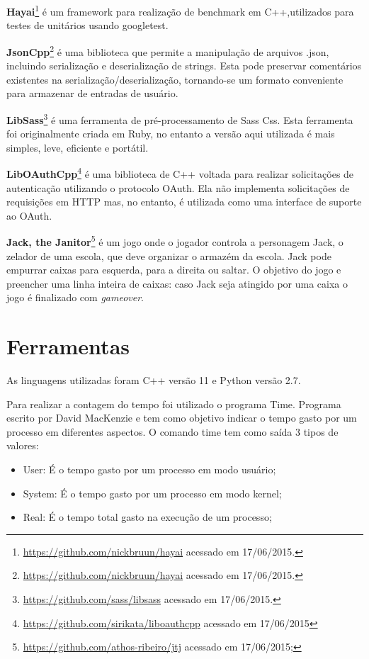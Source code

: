 \textbf{Hayai}\footnote{\url{https://github.com/nickbruun/hayai} acessado em
 17/06/2015.} é um framework para realização de benchmark em C++,utilizados
 para testes de unitários usando googletest.

\textbf{JsonCpp}\footnote{\url{https://github.com/nickbruun/hayai} acessado
 em 17/06/2015.} é uma biblioteca que permite a manipulação de arquivos .json,
 incluindo serialização e deserialização de strings. Esta pode preservar
 comentários existentes na serialização/deserialização, tornando-se um formato
 conveniente para armazenar de entradas de usuário.

\textbf{LibSass}\footnote{\url{https://github.com/sass/libsass} acessado
 em 17/06/2015.} é uma ferramenta de pré-processamento de Sass Css. Esta
 ferramenta foi originalmente criada em Ruby, no entanto a versão aqui utilizada
 é mais simples, leve, eficiente e portátil.

\textbf{LibOAuthCpp}\footnote{\url{https://github.com/sirikata/liboauthcpp}
 acessado em 17/06/2015} é uma biblioteca de C++ voltada para realizar solicitações
 de autenticação utilizando o protocolo OAuth. Ela não implementa solicitações de
 requisições em HTTP mas, no entanto, é utilizada como uma interface de suporte ao
 OAuth.

\textbf{Jack, the Janitor}\footnote{\url{https://github.com/athos-ribeiro/jtj}
 acessado em 17/06/2015;} é um jogo onde o jogador controla  a personagem Jack,
 o zelador de uma escola, que deve organizar o armazém da escola. Jack pode empurrar
 caixas para esquerda, para a direita ou saltar. O objetivo do jogo e preencher uma
 linha inteira de caixas: caso Jack seja atingido por uma caixa o jogo é finalizado
 com \textit{gameover}.

\section{Ferramentas}

As linguagens utilizadas foram C++ versão 11 e Python versão 2.7.

Para realizar a contagem do tempo foi utilizado o programa Time.
 Programa escrito por David MacKenzie e tem como objetivo indicar o tempo gasto
 por um processo em diferentes aspectos.
 O comando time tem como saída 3 tipos de valores:

\begin{itemize}
	\item User: É o tempo gasto por um processo em modo usuário;
	\item System:  É o tempo gasto por um processo em modo kernel;
	\item Real:  É o tempo total gasto na execução de um processo;
\end{itemize}

